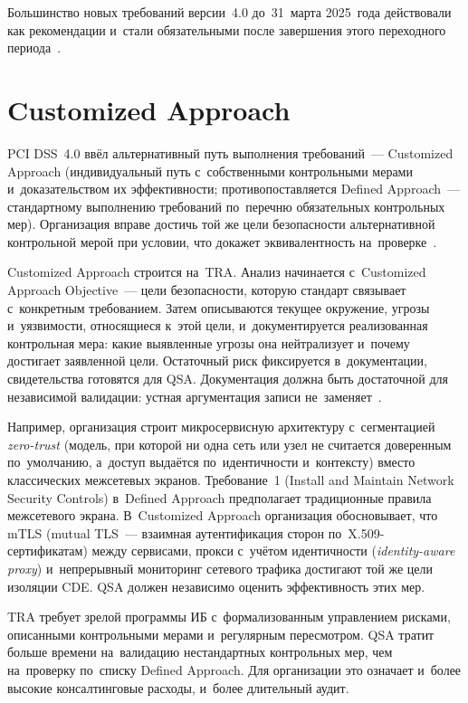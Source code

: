 Большинство новых требований версии~4.0 до~31~марта 2025~года действовали как
рекомендации и~стали обязательными после завершения этого переходного
периода~\cite{pci-dss-4}.

\section{Customized Approach}\label{sec:pci-customized}

PCI DSS~4.0 ввёл альтернативный путь выполнения требований~--- Customized
Approach (индивидуальный путь с~собственными контрольными мерами
  и~доказательством их эффективности; противопоставляется Defined
  Approach~--- стандартному выполнению
требований по~перечню обязательных контрольных мер). Организация вправе достичь
той же цели безопасности альтернативной контрольной мерой при условии, что докажет
эквивалентность на~проверке~\cite{pci-dss-4}.

Customized Approach строится на~TRA. Анализ начинается с~Customized Approach
Objective~--- цели безопасности, которую стандарт связывает с~конкретным
требованием. Затем описываются текущее окружение, угрозы и~уязвимости,
относящиеся к~этой цели, и~документируется реализованная контрольная мера: какие
выявленные угрозы она нейтрализует и~почему достигает заявленной цели.
Остаточный риск фиксируется в~документации, свидетельства готовятся для QSA.
Документация должна быть достаточной для независимой валидации: устная
аргументация записи не~заменяет~\cite{pci-dss-4}.

Например, организация строит микросервисную архитектуру с~сегментацией
\textit{zero-trust} (модель, при которой ни одна сеть или узел не считается
доверенным по~умолчанию, а~доступ выдаётся по~идентичности и~контексту) вместо
классических межсетевых экранов. Требование~1 (Install and Maintain Network
Security Controls) в~Defined Approach предполагает традиционные правила
межсетевого экрана. В~Customized Approach организация обосновывает, что mTLS
(mutual TLS~--- взаимная аутентификация сторон по~X.509-сертификатам) между
сервисами, прокси с~учётом идентичности (\textit{identity-aware proxy})
и~непрерывный мониторинг сетевого трафика достигают той же
цели изоляции CDE. QSA должен независимо оценить
эффективность этих мер.

TRA требует зрелой программы ИБ с~формализованным управлением рисками,
описанными контрольными мерами и~регулярным пересмотром. QSA тратит больше
времени на~валидацию нестандартных контрольных мер, чем на~проверку
по~списку Defined
Approach. Для организации это означает и~более высокие консалтинговые расходы,
и~более длительный аудит.

